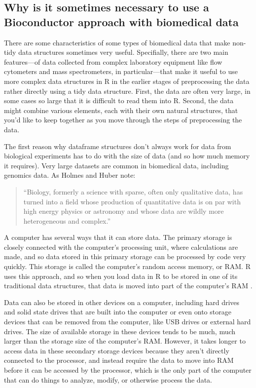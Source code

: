 \documentclass[]{tufte-book}
\begin{document}
\subsection{Why is it sometimes necessary to use a Bioconductor approach with biomedical data}\label{why-is-it-sometimes-necessary-to-use-a-bioconductor-approach-with-biomedical-data}

There are some characteristics of some types of biomedical data that make
non-tidy data structures sometimes very useful. Specifially, there are two main
features---of data collected from complex laboratory equipment like flow
cytometers and mass spectrometers, in particular---that make it useful to use
more complex data structures in R in the earlier stages of preprocessing the
data rather directly using a tidy data structure. First, the data are often very
large, in some cases so large that it is difficult to read them into R. Second,
the data might combine various elements, each with their own natural structures,
that you'd like to keep together as you move through the steps of preprocessing
the data.

The first reason why dataframe structures don't always work for data from
biological experiments has to do with the size of data (and so how much
memory it requires). Very large datasets are common in biomedical data,
including genomics data. As Holmes and Huber note:

\begin{quote}
``Biology, formerly a science with sparse, often only qualitative data, has
turned into a field whose production of quantitative data is on par with high
energy physics or astronomy and whose data are wildly more heterogeneous and
complex.'' \citep{holmes2018modern}
\end{quote}

A computer has several ways that it can store data. The primary storage is
closely connected with the computer's processing unit, where calculations are
made, and so data stored in this primary storage can be processed by code very
quickly. This storage is called the computer's random access memory, or RAM. R
uses this approach, and so when you load data in R to be stored in one of its
traditional data structures, that data is moved into part of the computer's RAM
\citep{burns2011r, gillespie2016efficient}.

Data can also be stored in other devices on a computer, including hard drives
and solid state drives that are built into the computer or even onto storage
devices that can be removed from the computer, like USB drives or external hard
drives. The size of available storage in these devices tends to be much, much
larger than the storage size of the computer's RAM. However, it takes longer to
access data in these secondary storage devices because they aren't directly
connected to the processor, and instead require the data to move into RAM before
it can be accessed by the processor, which is the only part of the computer that
can do things to analyze, modify, or otherwise process the data.
\end{document}
